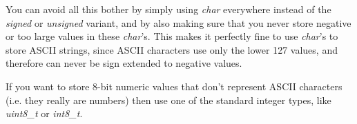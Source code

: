 \documentclass{article}
\begin{document}
You can avoid all this bother by simply using \emph{char} everywhere instead of
the \emph{signed} or \emph{unsigned} variant, and by also making sure that you
never store negative or too large values in these \emph{char}'s. This makes it
perfectly fine to use \emph{char}'s to store ASCII strings, since ASCII 
characters use only the lower 127 values, and therefore can never be sign 
extended to negative values.

If you want to store 8-bit numeric values that don’t represent ASCII characters
(i.e. they really are numbers) then use one of the standard integer types, like
\emph{uint8\_t} or \emph{int8\_t}.
\end{document}
